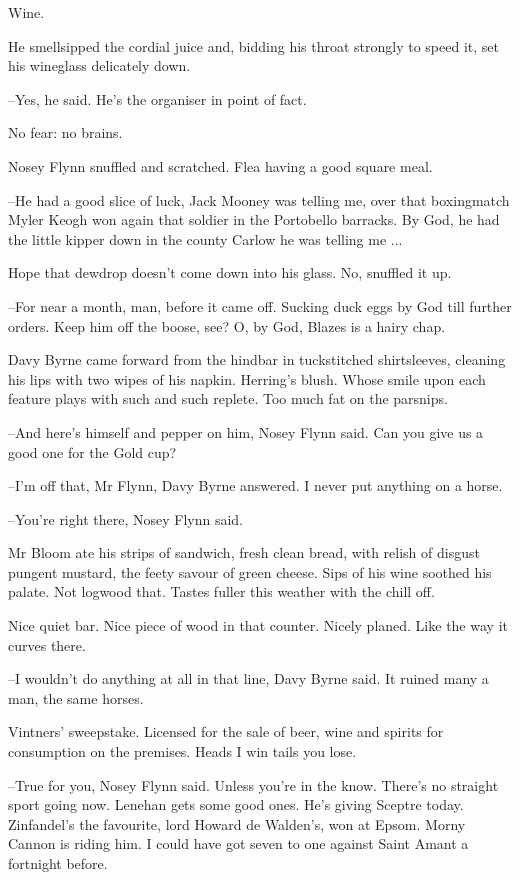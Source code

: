Wine.

He smellsipped the cordial juice and, bidding his throat strongly to
speed it, set his wineglass delicately down.

--Yes, he said. He's the organiser in point of fact.

No fear: no brains.

Nosey Flynn snuffled and scratched. Flea having a good square meal.

--He had a good slice of luck, Jack Mooney was telling me, over that
boxingmatch Myler Keogh won again that soldier in the Portobello
barracks. By God, he had the little kipper down in the county Carlow he
was telling me ...

Hope that dewdrop doesn't come down into his glass. No, snuffled it
up.

--For near a month, man, before it came off. Sucking duck eggs by God till
further orders. Keep him off the boose, see? O, by God, Blazes is a hairy
chap.

Davy Byrne came forward from the hindbar in tuckstitched
shirtsleeves, cleaning his lips with two wipes of his napkin. Herring's
blush. Whose smile upon each feature plays with such and such replete.
Too much fat on the parsnips.

--And here's himself and pepper on him, Nosey Flynn said. Can you give
us a good one for the Gold cup?

--I'm off that, Mr Flynn, Davy Byrne answered. I never put anything on a
horse.

--You're right there, Nosey Flynn said.

Mr Bloom ate his strips of sandwich, fresh clean bread, with relish of
disgust pungent mustard, the feety savour of green cheese. Sips of his
wine soothed his palate. Not logwood that. Tastes fuller this weather with
the chill off.

Nice quiet bar. Nice piece of wood in that counter. Nicely planed.
Like the way it curves there.

--I wouldn't do anything at all in that line, Davy Byrne said. It ruined
many a man, the same horses.

Vintners' sweepstake. Licensed for the sale of beer, wine and spirits
for consumption on the premises. Heads I win tails you lose.

--True for you, Nosey Flynn said. Unless you're in the know. There's no
straight sport going now. Lenehan gets some good ones. He's giving
Sceptre today. Zinfandel's the favourite, lord Howard de Walden's, won at
Epsom. Morny Cannon is riding him. I could have got seven to one against
Saint Amant a fortnight before.

